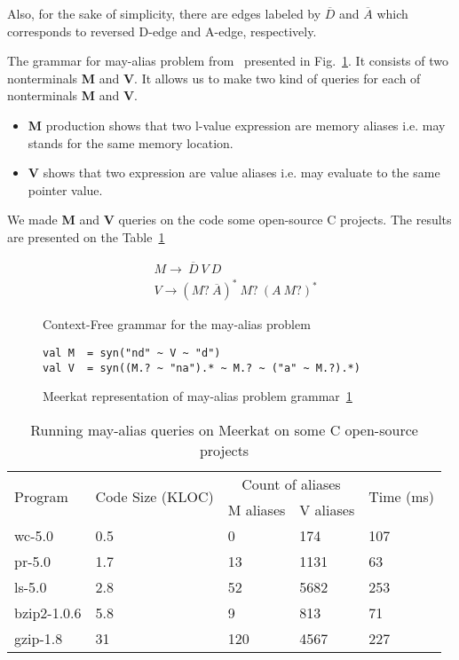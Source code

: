 Also, for the sake of simplicity, there are edges labeled by $\overline{D}$ and $\overline{A}$ which corresponds to reversed D-edge and A-edge, respectively.

The grammar for may-alias problem from~\cite{Zheng} presented in Fig.~\ref{lst:aliasGrammar}.
It consists of two nonterminals \textbf{M} and \textbf{V}.
It allows us to make two kind of queries for each of nonterminals \textbf{M} and \textbf{V}.

\begin{itemize}
    \item \textbf{M} production shows that two l-value expression are memory aliases i.e. may stands for the same memory location.
    \item \textbf{V} shows that two expression are value aliases i.e. may evaluate to the same pointer value.
\end{itemize}

We made \textbf{M} and \textbf{V} queries on the code some open-source C projects.
The results are presented on the Table~\ref{table:staticAnalysis} 

\begin{figure}[t]
\begin{align*}
& M \rightarrow\ \overline{D}\ V\ D\\
& V \rightarrow (M ?\ \overline{A})^{*} \ M?\ (A\ M?)^{*}
\end{align*}
\caption{Context-Free grammar for the may-alias problem}
\label{lst:aliasGrammar}
\end{figure}

\begin{figure}[h]
\begin{lstlisting}
val M  = syn("nd" ~ V ~ "d")
val V  = syn((M.? ~ "na").* ~ M.? ~ ("a" ~ M.?).*)
\end{lstlisting}
\caption{Meerkat representation of may-alias problem grammar~\ref{lst:aliasGrammar}}
\label{fig:aliasMeerkat}
\end{figure}


\begin{table}[t]
\centering
\begin{tabular}{|l|l|ll|l|}
\hline
\multirow{2}{*}{Program} & \multirow{2}{*}{Code Size (KLOC)} & \multicolumn{2}{c|}{Count of aliases} & \multirow{2}{*}{Time (ms)} \\ \cline{3-4}
 &  & \multicolumn{1}{c|}{M aliases} & \multicolumn{1}{c|}{V aliases} &  \\ 
\hline
\hline
wc-5.0      & 0.5 & 0   & 174  & 107 \\
pr-5.0      & 1.7 & 13  & 1131 & 63  \\
ls-5.0      & 2.8 & 52  & 5682 & 253 \\
bzip2-1.0.6 & 5.8 & 9   & 813  & 71  \\
gzip-1.8    & 31  & 120 & 4567 & 227 \\
\hline
\end{tabular}
\caption{Running may-alias queries on Meerkat on some C open-source projects}
\label{table:staticAnalysis}
\end{table}

